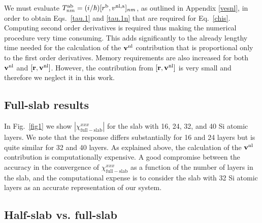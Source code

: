 \documentclass[floatfix,prb,aps,superscriptaddress,11pt,preprint,letterpaper]{revtex4}
\def\chon{black}
\begin{document}
{\color{\chon} 
We must evaluate 
$T^{\mathrm{a}\mathrm{b}}_{nm}=(i/\hbar)[r^{\mathrm{b}},v^{\mathrm{nl},\mathrm{a}}]_{nm}$,
as outlined in Appendix \ref{vesnl},
in order to obtain 
Eqs.~\eqref{tau.1} and \eqref{tau.1n} that are required for 
Eq.~\eqref{chis}.
Computing second 
order derivatives is required thus making the numerical procedure very 
time consuming. This adds significantly to the already lengthy time needed 
for the calculation of the $\mathbf{v}^{\mathrm{nl}}$ contribution that is
proportional only to 
the first order derivatives. 
Memory requirements are also increased for both $\mathbf{v}^{\mathrm{nl}}$ and 
$[\mathbf{r},\mathbf{v}^{\mathrm{nl}}]$. However, the contribution from $[\mathbf{r},\mathbf{v}^{\mathrm{nl}}]$ 
is very small\cite{valerie} and therefore we neglect it in this work.}

\subsection{Full-slab results}\label{results}

In Fig.~\ref{fig1} we show $|\chi_{\mathrm{full-slab}}^{xxx}|$
for {\color{\chon} the} slab {\color{\chon} with} 
16, 24, 32, and 40 Si atomic layers. 
{\color{\chon} We note that the response differs substantially 
for 16 and 24 layers but is quite similar for 32 and 40 layers.}
As explained above,
the calculation of {\color{\chon} the $\mathbf{v}^{\mathrm{nl}}$ contribution is 
computationally expensive.} 
A good compromise between the accuracy in the convergence of
$\chi^{xxx}_{\mathrm{full-slab}}$ as a function of the number
of layers in the slab, and the computational 
{\color{\chon} expense is to consider} 
the slab with 32 Si atomic layers as 
{\color{\chon} an accurate representation} of our 
{\color{\chon} system.}

\subsection{Half-slab vs. full-slab}
\end{document}
